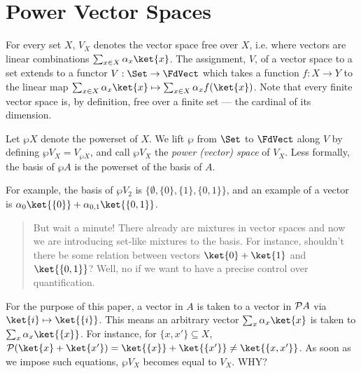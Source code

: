 \section{Power Vector Spaces}
\label{power}



For every set $X$, $V_X$ denotes the vector space free over $X$, i.e. where
vectors are linear combinations $\sum_{x \in X} \alpha_x\ket{x}$. The
assignment, $V$, of a vector space to a set extends to a functor $V : \Set
\to \FdVect$ which takes a function $f : X \to Y$ to the linear map
$\sum_{x \in X} \alpha_x \ket{x} \mapsto \sum_{x \in X} \alpha_x f(\ket{x})$. 
Note that every finite vector space is, by definition, free over a
finite set --- the cardinal of its dimension. 

Let $\wp X$ denote the powerset of $X$.  We lift
$\wp$ from $\Set$ to $\FdVect$ along $V$ by
defining $\wp V_X = V_{\wp X}$, and call $\wp V_X$ the \emph{power
(vector) space} of $V_X$. Less formally, the basis of $\wp A$ is the
powerset of the basis of $A$.

For example, the basis of $\wp V_2$ is $\{\emptyset, \{0\}, \{1\},
\{0,1\}\}$, and an example of a vector is $\alpha_0
\ket{\{0\}}+\alpha_{0,1}\ket{\{0,1\}}$. 

\begin{quote}{\footnotesize
But wait a minute! There already are mixtures in vector spaces and now
we are introducing set-like mixtures to the basis. For instance,
shouldn't there be some relation between vectors $\ket{0} + \ket{1}$
and $\ket{\{0,1\}}$? Well, no if we want to have a precise control
over quantification.}
\end{quote}


For the purpose of this paper, a vector in $A$ is taken to a vector in
${\cal P}A$ via $\ket{i} \mapsto \ket{\{ i \}}$. This means an
arbitrary vector $\sum_{x}\alpha_x\ket{x}$ is taken to
$\sum_{x}\alpha_x\ket{\{x\}}$. For instance, for $\{x , x'\} \subseteq X$,
$\mathcal{P}(\ket{x} + \ket{x'}) = \ket{\{x\}} + \ket{\{x'\}} \neq
\ket{\{ x,x' \}}$. As soon as we impose such equations, $\wp V_X$
becomes equal to $V_X$.  WHY?

